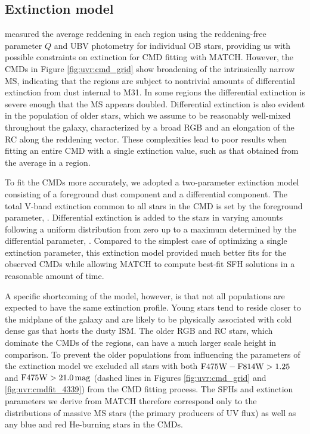 \subsection{Extinction model}\label{uvr:sfhs.extinction}

 measured the average \ebv{} reddening in each
region using the reddening-free parameter $Q$ and UBV photometry for individual
OB stars, providing us with possible constraints on extinction for CMD fitting
with MATCH. However, the CMDs in Figure \ref{fig:uvr:cmd_grid} show broadening of
the intrinsically narrow MS, indicating that the regions are subject to
nontrivial amounts of differential extinction from dust internal to M31. In
some regions the differential extinction is severe enough that the MS appears
doubled. Differential extinction is also evident in the population of older
stars, which we assume to be reasonably well-mixed throughout the galaxy,
characterized by a broad RGB and an elongation of the RC along the reddening
vector. These complexities lead to poor results when fitting an entire CMD with
a single extinction value, such as that obtained from the average
\ebv{} in a region.

To fit the CMDs more accurately, we adopted a two-parameter extinction model
consisting of a foreground dust component and a differential component. The
total V-band extinction common to all stars in the CMD is set by the foreground
parameter, \avf{}. Differential extinction is added to the stars in
varying amounts following a uniform distribution from zero up to a maximum
determined by the differential parameter, \dav{}. Compared to the
simplest case of optimizing a single extinction parameter, this extinction
model provided much better fits for the observed CMDs while allowing MATCH to
compute best-fit SFH solutions in a reasonable amount of time.

A specific shortcoming of the model, however, is that not all populations are
expected to have the same extinction profile. Young stars tend to reside closer
to the midplane of the galaxy and are likely to be physically associated with
cold dense gas that hosts the dusty ISM. The older RGB and RC stars, which
dominate the CMDs of the regions, can have a much larger scale height in
comparison. To prevent the older populations from influencing the parameters of
the extinction model we excluded all stars with both $\mathrm{F475W} - \mathrm{F814W} >
1.25$ and $\mathrm{F475W} > 21.0\,\mathrm{mag}$ (dashed lines in Figures
\ref{fig:uvr:cmd_grid} and \ref{fig:uvr:cmdfit_4339}) from the CMD fitting process. The
SFHs and extinction parameters we derive from MATCH therefore correspond only
to the distributions of massive MS stars (the primary producers of UV flux) as
well as any blue and red He-burning stars in the CMDs.

